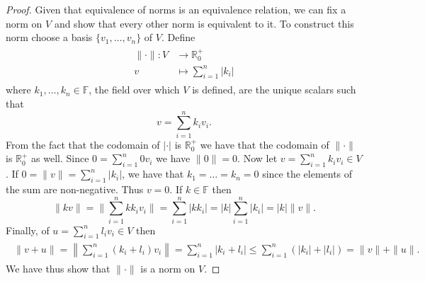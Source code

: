 \begin{proof}
	Given that equivalence of norms is an equivalence relation, we can fix a norm on $V$ and show that every other norm is equivalent to it. To construct this norm choose a basis $\{v_1,\dots,v_n\}$ of $V$. Define
	\begin{align}
	\begin{split}
		\|\cdot\|:V&\rightarrow\mathbb{R}^+_0\\
		v&\mapsto\sum_{i=1}^n|k_i|
	\end{split}
	\end{align}
where $k_1,\dots,k_n\in\mathbb{F}$, the field over which $V$ is defined, are the unique scalars such that
	\begin{equation}
		v=\sum_{i=1}^n k_iv_i.
	\end{equation}	 
From the fact that the codomain of $|\cdot|$ is $\mathbb{R}^+_0$ we have that the codomain of $\|\cdot\|$ is $\mathbb{R}^+_0$ as well. Since $0=\sum_{i=1}^n0v_i$ we have $\|0\|=0$. Now let $v=\sum_{i=1}^nk_iv_i\in V$. If $0=\|v\|=\sum_{i=1}^n |k_i|$, we have that $k_1=\dots=k_n=0$ since the elements of the sum are non-negative. Thus $v =0$. If $k\in\mathbb{F}$ then
	\begin{equation}
		\|kv\|=\|\sum_{i=1}^nkk_iv_i\|=\sum_{i=1}^n|kk_i|=|k|\sum_{i=1}^n|k_i|=|k|\|v\|.
	\end{equation}
Finally, of $u=\sum_{i=1}^n l_iv_i\in V$ then
	\begin{align}
	\begin{split}
		\|v+u\|=\left\lVert\sum_{i=1}^n(k_i+l_i)v_i\right\rVert=\sum_{i=1}^n|k_i+l_i|\leq\sum_{i=1}^n(|k_i|+|l_i|)=\|v\|+\|u\|.
	\end{split}
	\end{align}
We have thus show that $\|\cdot\|$ is a norm on $V$.


\end{proof}
